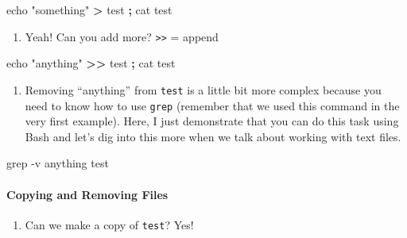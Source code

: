 \documentclass[
]{book}
\newenvironment{Shaded}{\begin{snugshade}}{\end{snugshade}}
\newcommand{\AttributeTok}[1]{\textcolor[rgb]{0.77,0.63,0.00}{#1}}
\newcommand{\BuiltInTok}[1]{#1}
\newcommand{\FunctionTok}[1]{\textcolor[rgb]{0.00,0.00,0.00}{#1}}
\newcommand{\KeywordTok}[1]{\textcolor[rgb]{0.13,0.29,0.53}{\textbf{#1}}}
\newcommand{\NormalTok}[1]{#1}
\newcommand{\OperatorTok}[1]{\textcolor[rgb]{0.81,0.36,0.00}{\textbf{#1}}}
\newcommand{\StringTok}[1]{\textcolor[rgb]{0.31,0.60,0.02}{#1}}
\providecommand{\tightlist}{%
  \setlength{\itemsep}{0pt}\setlength{\parskip}{0pt}}
\begin{document}
\begin{Shaded}
\begin{Highlighting}[]

\BuiltInTok{echo} \StringTok{"something"} \OperatorTok{\textgreater{}}\NormalTok{ test }\KeywordTok{;} \FunctionTok{cat}\NormalTok{ test }
\end{Highlighting}
\end{Shaded}

\begin{enumerate}
\def\labelenumi{\arabic{enumi}.}
\setcounter{enumi}{5}
\tightlist
\item
  Yeah! Can you add more? \texttt{\textgreater{}\textgreater{}} = append
\end{enumerate}

\begin{Shaded}
\begin{Highlighting}[]

\BuiltInTok{echo} \StringTok{"anything"} \OperatorTok{\textgreater{}\textgreater{}}\NormalTok{ test }\KeywordTok{;} \FunctionTok{cat}\NormalTok{ test }
\end{Highlighting}
\end{Shaded}

\begin{enumerate}
\def\labelenumi{\arabic{enumi}.}
\setcounter{enumi}{6}
\tightlist
\item
  Removing ``anything'' from \texttt{test} is a little bit more complex because you need to know how to use \texttt{grep} (remember that we used this command in the very first example). Here, I just demonstrate that you can do this task using Bash and let's dig into this more when we talk about working with text files.
\end{enumerate}

\begin{Shaded}
\begin{Highlighting}[]

\FunctionTok{grep} \AttributeTok{{-}v} \StringTok{\textquotesingle{}anything\textquotesingle{}}\NormalTok{ test}
\end{Highlighting}
\end{Shaded}

\hypertarget{copying-and-removing-files}{%
\paragraph{Copying and Removing Files}\label{copying-and-removing-files}}

\begin{enumerate}
\def\labelenumi{\arabic{enumi}.}
\tightlist
\item
  Can we make a copy of \texttt{test}? Yes!
\end{enumerate}
\end{document}
